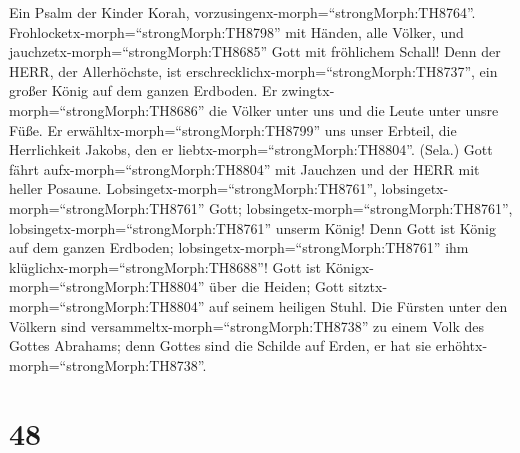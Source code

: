  Ein Psalm der Kinder Korah,
vorzusingenx-morph=``strongMorph:TH8764''.
Frohlocketx-morph=``strongMorph:TH8798'' mit Händen, alle Völker, und
jauchzetx-morph=``strongMorph:TH8685'' Gott mit fröhlichem Schall!
 Denn der HERR, der Allerhöchste, ist
erschrecklichx-morph=``strongMorph:TH8737'', ein großer König auf dem
ganzen Erdboden.  Er zwingtx-morph=``strongMorph:TH8686''
die Völker unter uns und die Leute unter unsre Füße.  Er
erwähltx-morph=``strongMorph:TH8799'' uns unser Erbteil, die
Herrlichkeit Jakobs, den er liebtx-morph=``strongMorph:TH8804''. (Sela.)
 Gott fährt aufx-morph=``strongMorph:TH8804'' mit Jauchzen
und der HERR mit heller Posaune. 
Lobsingetx-morph=``strongMorph:TH8761'',
lobsingetx-morph=``strongMorph:TH8761'' Gott;
lobsingetx-morph=``strongMorph:TH8761'',
lobsingetx-morph=``strongMorph:TH8761'' unserm König!  Denn
Gott ist König auf dem ganzen Erdboden;
lobsingetx-morph=``strongMorph:TH8761'' ihm
klüglichx-morph=``strongMorph:TH8688''!  Gott ist
Königx-morph=``strongMorph:TH8804'' über die Heiden; Gott
sitztx-morph=``strongMorph:TH8804'' auf seinem heiligen Stuhl.
 Die Fürsten unter den Völkern sind
versammeltx-morph=``strongMorph:TH8738'' zu einem Volk des Gottes
Abrahams; denn Gottes sind die Schilde auf Erden, er hat sie
erhöhtx-morph=``strongMorph:TH8738''.

\hypertarget{section-47}{%
\section{48}\label{section-47}}

